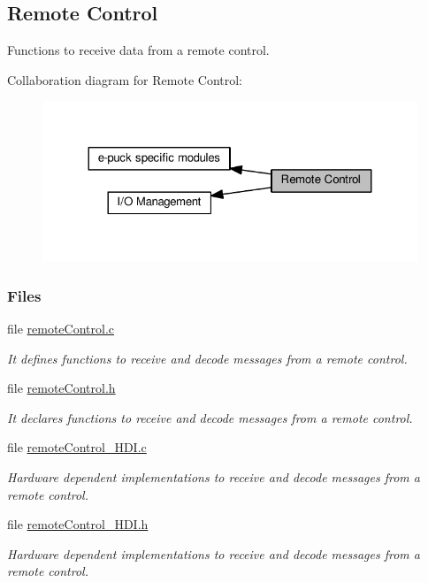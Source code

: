 \hypertarget{group__remotecontrol}{}\subsection{Remote Control}
\label{group__remotecontrol}


Functions to receive data from a remote control.  


Collaboration diagram for Remote Control\+:\nopagebreak
\begin{figure}[H]
\begin{center}
\leavevmode
\includegraphics[width=324pt]{db/d36/group__remotecontrol}
\end{center}
\end{figure}
\subsubsection*{Files}
\begin{DoxyCompactItemize}
\item 
file \hyperlink{remoteControl_8c}{remote\+Control.\+c}
\begin{DoxyCompactList}\small\item\em It defines functions to receive and decode messages from a remote control. \end{DoxyCompactList}\item 
file \hyperlink{remoteControl_8h}{remote\+Control.\+h}
\begin{DoxyCompactList}\small\item\em It declares functions to receive and decode messages from a remote control. \end{DoxyCompactList}\item 
file \hyperlink{remoteControl__HDI_8c}{remote\+Control\+\_\+\+H\+D\+I.\+c}
\begin{DoxyCompactList}\small\item\em Hardware dependent implementations to receive and decode messages from a remote control. \end{DoxyCompactList}\item 
file \hyperlink{remoteControl__HDI_8h}{remote\+Control\+\_\+\+H\+D\+I.\+h}
\begin{DoxyCompactList}\small\item\em Hardware dependent implementations to receive and decode messages from a remote control. \end{DoxyCompactList}\end{DoxyCompactItemize}


